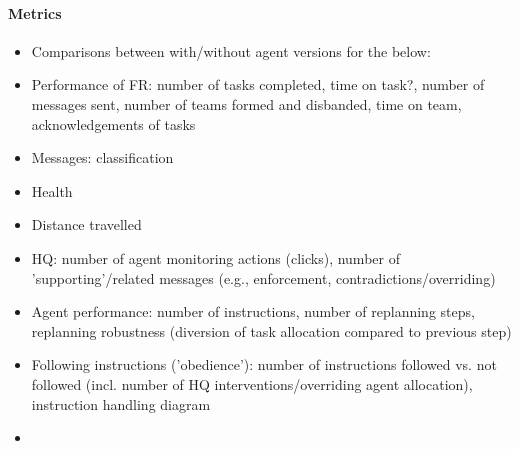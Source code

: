 \paragraph{Metrics}
\begin{itemize}
\item{Comparisons between with/without agent versions for the below:}
\item{Performance of FR: number of tasks completed, time on task?, number of messages sent, number of teams formed and disbanded, time on team, acknowledgements of tasks}
\item{Messages: classification}
\item{Health}
\item{Distance travelled}
\item{HQ: number of agent monitoring actions (clicks), number of 'supporting'/related messages (e.g., enforcement, contradictions/overriding)}
\item{Agent performance: number of instructions, number of replanning steps, replanning robustness (diversion of task allocation compared to previous step)}
\item{Following instructions ('obedience'): number of instructions followed vs. not followed (incl. number of HQ interventions/overriding agent allocation), instruction handling diagram}
\item
\end{itemize}
